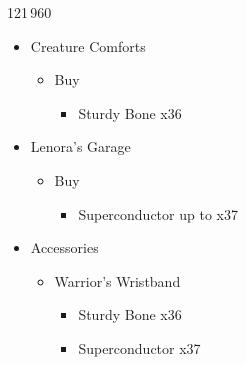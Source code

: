 \begin{shop}{121\,960}
\begin{itemize}
\begin{itemize}
			\end{itemize}
		\item Creature Comforts
			\begin{itemize}
				\item Buy
					\begin{itemize}
						\item Sturdy Bone x36
					\end{itemize}
			\end{itemize}
		\item Lenora's Garage
			\begin{itemize}
				\item Buy
					\begin{itemize}
						\item Superconductor up to x37
					\end{itemize}
			\end{itemize}									
	\end{itemize}
\end{shop}

\begin{upgrade}
	\begin{itemize}
		\item Accessories
			\begin{itemize}
				\item Warrior's Wristband
					\begin{itemize}
						\item Sturdy Bone x36
						\item Superconductor x37
					\end{itemize}
			\end{itemize}
	\end{itemize}	
\end{upgrade}
	
